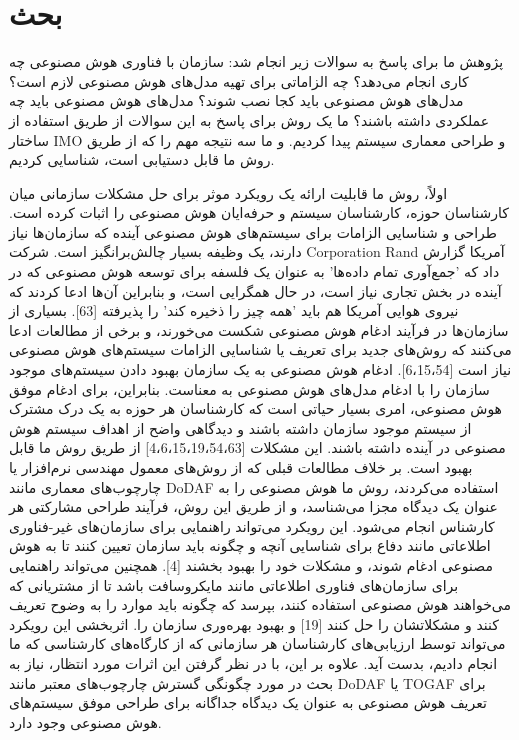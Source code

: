 \documentclass[a4paper,10pt]{article}
\begin{document}
    \section{بحث}

        پژوهش ما برای پاسخ به سوالات زیر انجام شد: سازمان با فناوری هوش مصنوعی چه کاری انجام می‌دهد؟ چه الزاماتی برای تهیه مدل‌های هوش مصنوعی لازم است؟ مدل‌های هوش مصنوعی باید کجا نصب شوند؟ مدل‌های هوش مصنوعی باید چه عملکردی داشته باشند؟ ما یک روش برای پاسخ به این سوالات از طریق استفاده از ساختار IMO و طراحی معماری سیستم پیدا کردیم. و ما سه نتیجه مهم را که از طریق روش ما قابل دستیابی است، شناسایی کردیم.

        اولاً، روش ما قابلیت ارائه یک رویکرد موثر برای حل مشکلات سازمانی میان کارشناسان حوزه، کارشناسان سیستم و حرفه‌ایان هوش مصنوعی را اثبات کرده است. طراحی و شناسایی الزامات برای سیستم‌های هوش مصنوعی آینده که سازمان‌ها نیاز دارند، یک وظیفه بسیار چالش‌برانگیز است. شرکت Corporation Rand آمریکا گزارش داد که 'جمع‌آوری تمام داده‌ها' به عنوان یک فلسفه برای توسعه هوش مصنوعی که در آینده در بخش تجاری نیاز است، در حال همگرایی است، و بنابراین آن‌ها ادعا کردند که نیروی هوایی آمریکا هم باید 'همه چیز را ذخیره کند' را پذیرفته [63]. بسیاری از سازمان‌ها در فرآیند ادغام هوش مصنوعی شکست می‌خورند، و برخی از مطالعات ادعا می‌کنند که روش‌های جدید برای تعریف یا شناسایی الزامات سیستم‌های هوش مصنوعی نیاز است [6،15،54]. ادغام هوش مصنوعی به یک سازمان بهبود دادن سیستم‌های موجود سازمان را با ادغام مدل‌های هوش مصنوعی به معناست. بنابراین، برای ادغام موفق هوش مصنوعی، امری بسیار حیاتی است که کارشناسان هر حوزه به یک درک مشترک از سیستم موجود سازمان داشته باشند و دیدگاهی واضح از اهداف سیستم هوش مصنوعی در آینده داشته باشند. این مشکلات [4،6،15،19،54،63] از طریق روش ما قابل بهبود است. بر خلاف مطالعات قبلی که از روش‌های معمول مهندسی نرم‌افزار یا چارچوب‌های معماری مانند DoDAF استفاده می‌کردند، روش ما هوش مصنوعی را به عنوان یک دیدگاه مجزا می‌شناسد، و از طریق این روش، فرآیند طراحی مشارکتی هر کارشناس انجام می‌شود. این رویکرد می‌تواند راهنمایی برای سازمان‌های غیر-فناوری اطلاعاتی مانند دفاع برای شناسایی آنچه و چگونه باید سازمان تعیین کنند تا به هوش مصنوعی ادغام شوند، و مشکلات خود را بهبود بخشند [4]. همچنین می‌تواند راهنمایی برای سازمان‌های فناوری اطلاعاتی مانند مایکروسافت باشد تا از مشتریانی که می‌خواهند هوش مصنوعی استفاده کنند، بپرسد که چگونه باید موارد را به وضوح تعریف کنند و مشکلاتشان را حل کنند [19] و بهبود بهره‌وری سازمان را. اثربخشی این رویکرد می‌تواند توسط ارزیابی‌های کارشناسان هر سازمانی که از کارگاه‌های کارشناسی که ما انجام دادیم، بدست آید. علاوه بر این، با در نظر گرفتن این اثرات مورد انتظار، نیاز به بحث در مورد چگونگی گسترش چارچوب‌های معتبر مانند DoDAF یا TOGAF برای تعریف هوش مصنوعی به عنوان یک دیدگاه جداگانه برای طراحی موفق سیستم‌های هوش مصنوعی وجود دارد.
\end{document}
